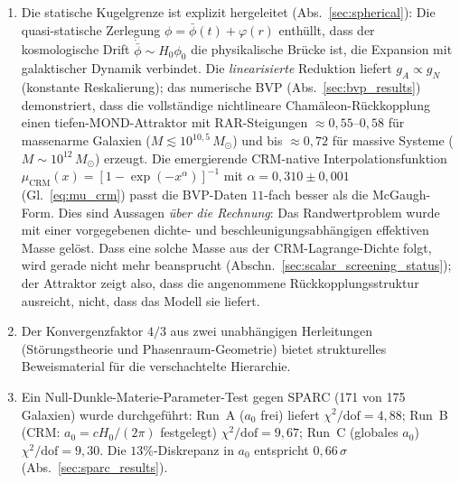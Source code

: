 \documentclass[aps,prd,twocolumn,superscriptaddress,nofootinbib]{revtex4-2}
\begin{document}
\begin{enumerate}
\item Die statische Kugelgrenze ist explizit hergeleitet (Abs.~\ref{sec:spherical}): Die quasi-statische Zerlegung $\phi = \bar{\phi}(t) + \varphi(r)$ enth\"ullt, dass der kosmologische Drift $\dot{\bar{\phi}} \sim H_0\phi_0$ die physikalische Br\"ucke ist, die Expansion mit galaktischer Dynamik verbindet. Die \textit{linearisierte} Reduktion liefert $g_A \propto g_N$ (konstante Reskalierung); das numerische BVP (Abs.~\ref{sec:bvp_results}) demonstriert, dass die vollst\"andige nichtlineare Cham\"aleon-R\"uckkopplung einen tiefen-MOND-Attraktor mit RAR-Steigungen $\approx 0{,}55$--$0{,}58$ f\"ur massenarme Galaxien ($M \lesssim 10^{10{,}5}\,M_\odot$) und bis $\approx 0{,}72$ f\"ur massive Systeme ($M \sim 10^{12}\,M_\odot$) erzeugt. Die emergierende CRM-native Interpolationsfunktion $\mu_{\mathrm{CRM}}(x) = [1 - \exp(-x^\alpha)]^{-1}$ mit $\alpha = 0{,}310 \pm 0{,}001$ (Gl.~\ref{eq:mu_crm}) passt die BVP-Daten $11$-fach besser als die McGaugh-Form. Dies sind Aussagen \textit{\"uber die Rechnung}: Das Randwertproblem wurde mit einer vorgegebenen dichte- und beschleunigungsabh\"angigen effektiven Masse gel\"ost. Dass eine solche Masse aus der CRM-Lagrange-Dichte folgt, wird gerade nicht mehr beansprucht (Abschn.~\ref{sec:scalar_screening_status}); der Attraktor zeigt also, dass die angenommene R\"uckkopplungsstruktur ausreicht, nicht, dass das Modell sie liefert.

\item Der Konvergenzfaktor $4/3$ aus zwei unabh\"angigen Herleitungen (St\"orungstheorie und Phasenraum-Geometrie) bietet strukturelles Beweismaterial f\"ur die verschachtelte Hierarchie.

\item Ein Null-Dunkle-Materie-Parameter-Test gegen SPARC (171 von 175 Galaxien) wurde durchgef\"uhrt: Run~A ($a_0$ frei) liefert $\chi^2/\mathrm{dof} = 4{,}88$; Run~B (CRM: $a_0 = cH_0/(2\pi)$ festgelegt) $\chi^2/\mathrm{dof} = 9{,}67$; Run~C (globales $a_0$) $\chi^2/\mathrm{dof} = 9{,}30$. Die $13\%$-Diskrepanz in $a_0$ entspricht $0{,}66\,\sigma$ (Abs.~\ref{sec:sparc_results}).
\end{enumerate}
\end{document}
